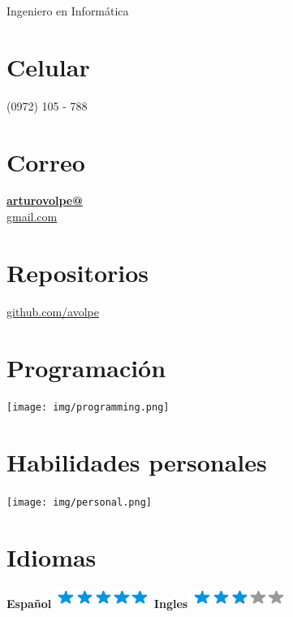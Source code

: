 \documentclass[]{friggeri-cv}
\begin{document}
{Ingeniero en Informática}


\begin{aside}
    \section{Celular}
        (0972) 105 - 788
        ~
    \section{Correo}
        \href{mailto:arturovolpe@gmail.com}{\textbf{arturovolpe@}\\gmail.com}
        ~
    \section{Repositorios}
        \href{https://github.com/avolpe}{github.com/avolpe}
        ~
    \section{Programación}
    \texttt{[image: img/programming.png]}
    ~
    \section{Habilidades personales}
    \texttt{[image: img/personal.png]}
    ~
\section{Idiomas}
\textbf{Español}\includegraphics[scale=0.40]{img/5stars.png}
\textbf{Ingles}\includegraphics[scale=0.40]{img/3stars.png}
\end{aside}
\end{document}
